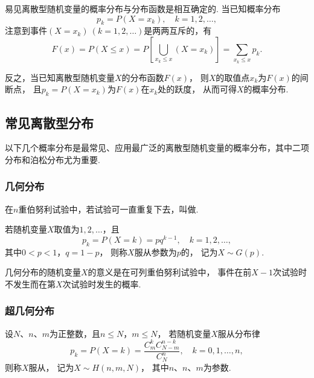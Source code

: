 易见离散型随机变量的概率分布与分布函数是相互确定的.
当已知概率分布\[
	p_k = P(X=x_k),
	\quad k=1,2,\dotsc,
\]
注意到事件\((X=x_k)\ (k=1,2,\dotsc)\)是两两互斥的，有\begin{equation}
	F(x) = P(X \leq x)
	= P\left[ \bigcup_{x_k \leq x} (X = x_k) \right]
	= \sum_{x_k \leq x} p_k.
\end{equation}

反之，当已知离散型随机变量\(X\)的分布函数\(F(x)\)，
则\(X\)的取值点\(x_k\)为\(F(x)\)的间断点，
且\(p_k = P(X=x_k)\)为\(F(x)\)在\(x_k\)处的跃度，
从而可得\(X\)的概率分布.

\subsection{常见离散型分布}

以下几个概率分布是最常见、应用最广泛的离散型随机变量的概率分布，其中二项分布和泊松分布尤为重要.

\subsubsection{几何分布}
\begin{definition}
在\(n\)重伯努利试验中，若试验可一直重复下去，叫做.
\end{definition}

\begin{definition}
若随机变量\(X\)取值为\(1,2,\dotsc\)，且\begin{equation}
p_k = P(X=k) = p q^{k-1}, \quad k=1,2,\dotsc,
\end{equation}其中\(0 < p < 1\)，\(q = 1-p\)，
则称\(X\)服从参数为\(p\)的，
记为\(X \sim G(p)\).
\end{definition}

几何分布的随机变量\(X\)的意义是在可列重伯努利试验中，
事件在前\(X-1\)次试验时不发生而在第\(X\)次试验时发生的概率.

\subsubsection{超几何分布}
\begin{definition}
设\(N\)、\(n\)、\(m\)为正整数，且\(n \leq N\)，\(m \leq N\)，
若随机变量\(X\)服从分布律\begin{equation}
	p_k = P(X=k) = \frac{C_m^k C_{N-m}^{n-k}}{C_N^n}, \quad k=0,1,\dotsc,n,
\end{equation}
则称\(X\)服从，
记为\(X \sim H(n,m,N)\)，
其中\(n\)、\(n\)、\(m\)为参数.
\end{definition}

